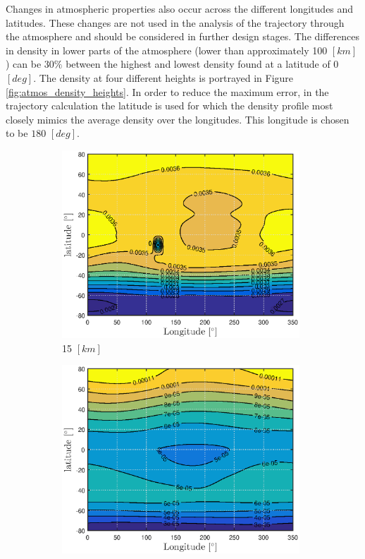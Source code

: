 Changes in atmospheric properties also occur across the different longitudes and latitudes. These changes are not used in the analysis of the trajectory through the atmosphere and should be considered in further design stages. The differences in density in lower parts of the atmosphere (lower than approximately 100 $[km]$) can be $30\%$ between the highest and lowest density found at a latitude of 0 $[deg]$. The density at four different heights is portrayed in Figure \ref{fig:atmos_density_heights}. In order to reduce the maximum error, in the trajectory calculation the latitude is used for which the density profile most closely mimics the average density over the longitudes. This longitude is chosen to be $180$ $\left[deg\right]$.


\begin{figure}[h]
	\centering
	\begin{subfigure}{0.49\textwidth}
		\centering
		\includegraphics[width=0.98\textwidth]{Figure/Atmosphere/density_15km.eps}
		\caption{15 $[km]$} 
		\label{fig:atmos_rho_15km}
	\end{subfigure}
	\begin{subfigure}{0.49\textwidth}
		\centering
		\includegraphics[width=0.98\textwidth]{Figure/Atmosphere/density_50km.eps}

\end{subfigure}
\end{figure}
